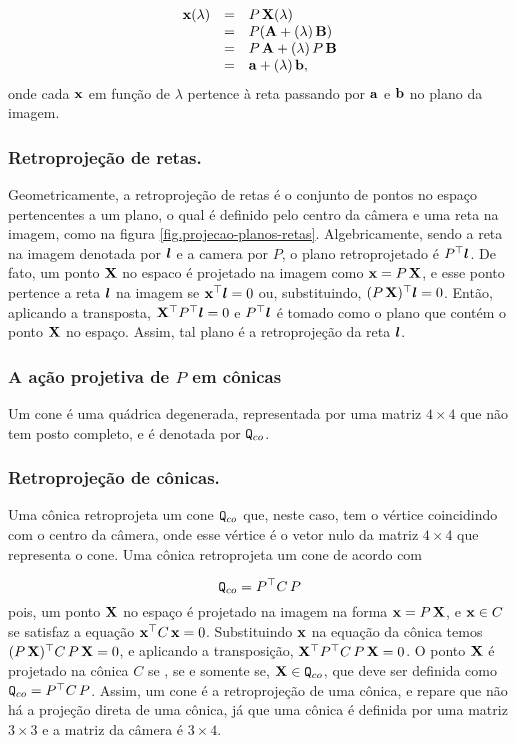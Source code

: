 \begin{equation*}
\begin{array}{rcl}
\mathbf{x}(\lambda)&=&P\,\mathbf{X}(\lambda)\\
&=&P({\bf A}+(\lambda)\,{\bf B})\\
&=&P\,{\bf A}+(\lambda)\,P\,{\bf B}\\
&=&{\bf a}+(\lambda)\,{\bf b},
\end{array}
\end{equation*}
onde cada $\mathbf{x}$ em função de $\lambda$ pertence à reta passando por ${\bf a}$ e ${\bf b}$ no plano da imagem.  

\subsubsection*{Retroprojeção de retas.}
Geometricamente, a retroprojeção de retas é o conjunto de pontos no espaço pertencentes a um plano, o qual é definido pelo centro da câmera e uma reta na imagem, como na figura \ref{fig.projecao-planos-retas}. Algebricamente, sendo a reta na imagem denotada por $\boldsymbol{l}$ e a camera por $P$, o plano retroprojetado é $P^\top\boldsymbol{l}$. De fato, um ponto $\mathbf{X}$ no espaco é projetado na imagem como $\mathbf{x}=P\,\mathbf{X}$, e esse ponto pertence a reta $\boldsymbol{l}$ na imagem se $\mathbf{x}^\top\boldsymbol{l}=0$ ou, substituindo, $(P\,\mathbf{X})^\top\boldsymbol{l}=0$. Então, aplicando a transposta, $\mathbf{X}^\top P^\top\boldsymbol{l}=0$ e $P^\top\boldsymbol{l}$ é tomado como o plano que contém o ponto $\mathbf{X}$ no espaço. Assim, tal plano é a retroprojeção da reta $\boldsymbol{l}$.  

\subsubsection*{A ação projetiva de $P$ em cônicas}
Um cone é uma quádrica degenerada, representada por uma matriz $4\times4$ que não tem posto completo, e é denotada por ${\tt Q}_{co}$.

\subsubsection*{Retroprojeção de cônicas.}
Uma cônica retroprojeta um cone ${\tt Q}_{co}$ que, neste caso, tem o vértice coincidindo com o centro da câmera, onde esse vértice é o vetor nulo da matriz $4\times4$ que representa o cone. Uma cônica retroprojeta um cone de acordo com 

\begin{equation*}
{\tt Q}_{co}=P^\top C\,P
\end{equation*}
pois, um ponto $\mathbf{X}$ no espaço é projetado na imagem na forma $\mathbf{x}=P\,\mathbf{X}$, e $\mathbf{x}\in C$ se satisfaz a equação $\mathbf{x}^\top C\,\mathbf{x}=0$. Substituindo $\mathbf{x}$ na equação da cônica temos $(P\,\mathbf{X})^\top C\,P\,\mathbf{X}=0$, e aplicando a transposição, $\mathbf{X}^\top P^\top C\,P\,\mathbf{X}=0$. O ponto $\mathbf{X}$ é projetado na cônica $C$ se , se e somente se, $\mathbf{X}\in {\tt Q}_{co}$, que deve ser definida como ${\tt Q}_{co}=P^\top C\,P$. Assim, um cone é a retroprojeção de uma cônica, e repare que não há a projeção direta de uma cônica, já que uma cônica é definida por uma matriz $3\times3$ e a matriz da câmera é $3\times4$.

